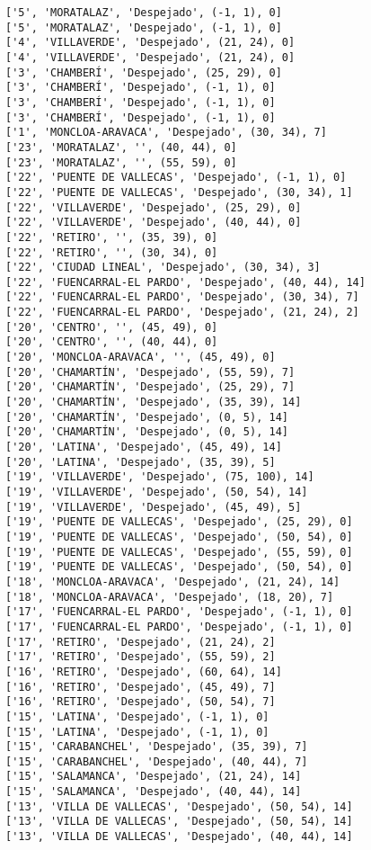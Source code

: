 \documentclass[11pt]{article}
\begin{document}
\begin{Verbatim}[commandchars=\\\{\}]
['5', 'MORATALAZ', 'Despejado', (-1, 1), 0]
['5', 'MORATALAZ', 'Despejado', (-1, 1), 0]
['4', 'VILLAVERDE', 'Despejado', (21, 24), 0]
['4', 'VILLAVERDE', 'Despejado', (21, 24), 0]
['3', 'CHAMBERÍ', 'Despejado', (25, 29), 0]
['3', 'CHAMBERÍ', 'Despejado', (-1, 1), 0]
['3', 'CHAMBERÍ', 'Despejado', (-1, 1), 0]
['3', 'CHAMBERÍ', 'Despejado', (-1, 1), 0]
['1', 'MONCLOA-ARAVACA', 'Despejado', (30, 34), 7]
['23', 'MORATALAZ', '', (40, 44), 0]
['23', 'MORATALAZ', '', (55, 59), 0]
['22', 'PUENTE DE VALLECAS', 'Despejado', (-1, 1), 0]
['22', 'PUENTE DE VALLECAS', 'Despejado', (30, 34), 1]
['22', 'VILLAVERDE', 'Despejado', (25, 29), 0]
['22', 'VILLAVERDE', 'Despejado', (40, 44), 0]
['22', 'RETIRO', '', (35, 39), 0]
['22', 'RETIRO', '', (30, 34), 0]
['22', 'CIUDAD LINEAL', 'Despejado', (30, 34), 3]
['22', 'FUENCARRAL-EL PARDO', 'Despejado', (40, 44), 14]
['22', 'FUENCARRAL-EL PARDO', 'Despejado', (30, 34), 7]
['22', 'FUENCARRAL-EL PARDO', 'Despejado', (21, 24), 2]
['20', 'CENTRO', '', (45, 49), 0]
['20', 'CENTRO', '', (40, 44), 0]
['20', 'MONCLOA-ARAVACA', '', (45, 49), 0]
['20', 'CHAMARTÍN', 'Despejado', (55, 59), 7]
['20', 'CHAMARTÍN', 'Despejado', (25, 29), 7]
['20', 'CHAMARTÍN', 'Despejado', (35, 39), 14]
['20', 'CHAMARTÍN', 'Despejado', (0, 5), 14]
['20', 'CHAMARTÍN', 'Despejado', (0, 5), 14]
['20', 'LATINA', 'Despejado', (45, 49), 14]
['20', 'LATINA', 'Despejado', (35, 39), 5]
['19', 'VILLAVERDE', 'Despejado', (75, 100), 14]
['19', 'VILLAVERDE', 'Despejado', (50, 54), 14]
['19', 'VILLAVERDE', 'Despejado', (45, 49), 5]
['19', 'PUENTE DE VALLECAS', 'Despejado', (25, 29), 0]
['19', 'PUENTE DE VALLECAS', 'Despejado', (50, 54), 0]
['19', 'PUENTE DE VALLECAS', 'Despejado', (55, 59), 0]
['19', 'PUENTE DE VALLECAS', 'Despejado', (50, 54), 0]
['18', 'MONCLOA-ARAVACA', 'Despejado', (21, 24), 14]
['18', 'MONCLOA-ARAVACA', 'Despejado', (18, 20), 7]
['17', 'FUENCARRAL-EL PARDO', 'Despejado', (-1, 1), 0]
['17', 'FUENCARRAL-EL PARDO', 'Despejado', (-1, 1), 0]
['17', 'RETIRO', 'Despejado', (21, 24), 2]
['17', 'RETIRO', 'Despejado', (55, 59), 2]
['16', 'RETIRO', 'Despejado', (60, 64), 14]
['16', 'RETIRO', 'Despejado', (45, 49), 7]
['16', 'RETIRO', 'Despejado', (50, 54), 7]
['15', 'LATINA', 'Despejado', (-1, 1), 0]
['15', 'LATINA', 'Despejado', (-1, 1), 0]
['15', 'CARABANCHEL', 'Despejado', (35, 39), 7]
['15', 'CARABANCHEL', 'Despejado', (40, 44), 7]
['15', 'SALAMANCA', 'Despejado', (21, 24), 14]
['15', 'SALAMANCA', 'Despejado', (40, 44), 14]
['13', 'VILLA DE VALLECAS', 'Despejado', (50, 54), 14]
['13', 'VILLA DE VALLECAS', 'Despejado', (50, 54), 14]
['13', 'VILLA DE VALLECAS', 'Despejado', (40, 44), 14]

\end{Verbatim}
\end{document}
